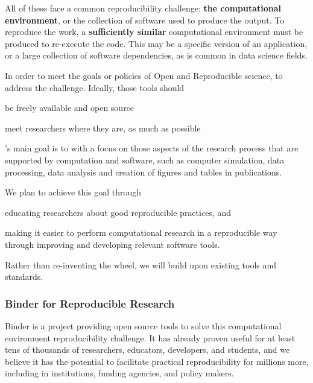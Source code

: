 All of these face a common reproducibility challenge: \textbf{the computational environment},
or the collection of software used to produce the output.
To reproduce the work, a \textbf{sufficiently similar} computational environment must be produced to re-execute the code.
This may be a specific version of an application, or a large collection of software dependencies,
as is common in data science fields.

In order to meet the goals or policies of Open and Reproducible science,
 to address the challenge. Ideally, those tools should
\begin{compactenum}
\item be freely available and open source
\item meet researchers where they are, as much as possible
\end{compactenum}

\TheProject's main goal is to  with a focus on those aspects of the research process that
are supported by computation and software, such as computer simulation, data
processing, data analysis and creation of figures and tables in publications.

We plan to achieve this goal through
\begin{compactitem}
\item educating researchers about good reproducible practices, and
\item making it easier to perform computational research in a reproducible way
  through improving and developing relevant software tools.
\end{compactitem}

Rather than re-inventing the wheel, we will build upon existing tools and standards.

\subsubsection{Binder for Reproducible Research}
\label{sec:reproducibility-example}

Binder is a project providing open source tools to solve this computational environment reproducibility challenge.
It has already proven useful for at least tens of thousands of researchers, educators, developers, and students,
and we believe it has the potential to facilitate practical reproducibility for millions more,
including in institutions, funding agencies, and policy makers.

